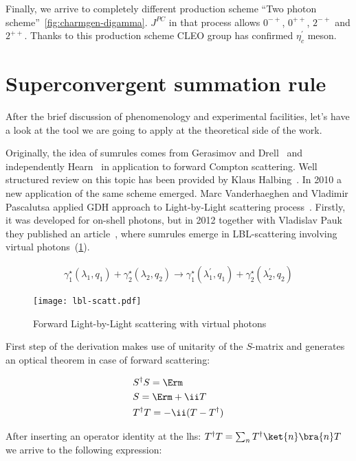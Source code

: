 Finally, we arrive to completely different production scheme ``Two photon scheme''~\cref{fig:charmgen-digamma}. $J^{PC}$ in that process allows $0^{-+}$, $0^{++}$, $2^{-+}$ and $2^{++}$. Thanks to this production scheme CLEO group has confirmed $\eta_c^\prime$ meson.~\cite{digamma}

\section{Superconvergent summation rule} \label{sec:intro:sumrules}
After the brief discussion of phenomenology and experimental facilities, let's have a look at the tool we are going to apply at the theoretical side of the work.

Originally,  the idea of sumrules comes from Gerasimov and Drell~\cite{gdh-g-orig} and independently Hearn~\cite{gdh-dh-orig} in application to forward Compton scattering. Well structured review on this topic has been provided by Klaus Halbing~\cite{gdh-helbing}. In 2010 a new application of the same scheme emerged. Marc Vanderhaeghen and Vladimir Pascalutsa applied GDH approach to Light-by-Light scattering process~\cite{lbl-sum1}. Firstly, it was developed for on-shell photons, but in 2012 together with Vladislav Pauk they published an article~\cite{lbl-sum2}, where sumrules emerge in LBL-scattering involving virtual photons~(\cref{fig:lbl-scatt}). 

\begin{align} \label{eq:lbl-scatt}
    \gamma^\star_1(\lambda_1, q_1) + \gamma^\star_2(\lambda_2, q_2) \rightarrow \gamma^\star_1(\lambda_1^\prime, q_1) + \gamma^\star_2(\lambda_2^\prime, q_2) 
\end{align}

\begin{figure}
    \centering
    \texttt{[image: lbl-scatt.pdf]}
    \caption{Forward Light-by-Light scattering with virtual photons \label{fig:lbl-scatt}}
\end{figure}

First step of the derivation makes use of unitarity of the $S$-matrix and generates an optical theorem in case of forward scattering:

\begin{align}
    & S^\dag S = \Erm \\
    & S = \Erm + \ii T \\
    & T^\dag T = -\ii(T - T^\dag)
\end{align}

After inserting an operator identity at the lhs: $T^\dag T = \sum_{n} T^\dag \ket{n}\bra{n} T$ we arrive to the following expression:

